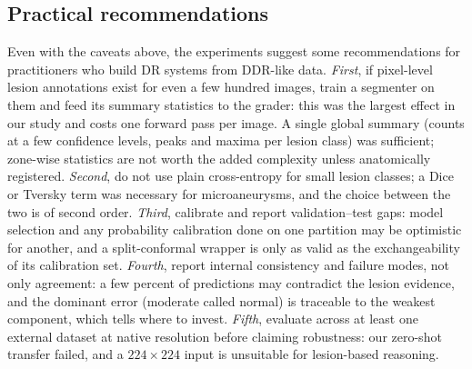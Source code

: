 \subsection{Practical recommendations}
Even with the caveats above, the experiments suggest some recommendations for practitioners who build DR systems from DDR-like data. \emph{First}, if pixel-level lesion annotations exist for even a few hundred images, train a segmenter on them and feed its summary statistics to the grader: this was the largest effect in our study and costs one forward pass per image. A single global summary (counts at a few confidence levels, peaks and maxima per lesion class) was sufficient; zone-wise statistics are not worth the added complexity unless anatomically registered. \emph{Second}, do not use plain cross-entropy for small lesion classes; a Dice or Tversky term was necessary for microaneurysms, and the choice between the two is of second order. \emph{Third}, calibrate and report validation--test gaps: model selection and any probability calibration done on one partition may be optimistic for another, and a split-conformal wrapper is only as valid as the exchangeability of its calibration set. \emph{Fourth}, report internal consistency and failure modes, not only agreement: a few percent of predictions may contradict the lesion evidence, and the dominant error (moderate called normal) is traceable to the weakest component, which tells where to invest. \emph{Fifth}, evaluate across at least one external dataset at native resolution before claiming robustness: our zero-shot transfer failed, and a $224\times224$ input is unsuitable for lesion-based reasoning.


